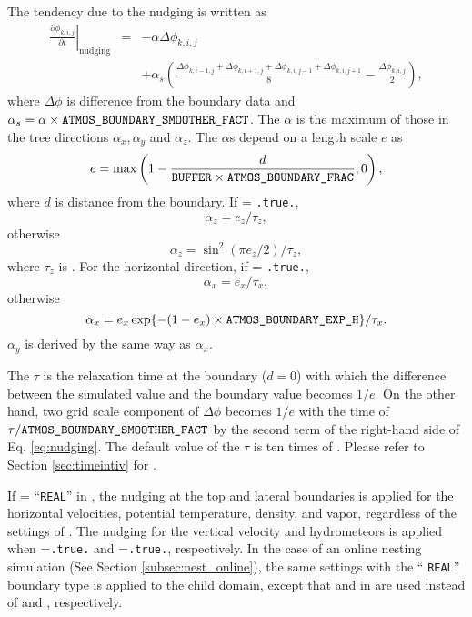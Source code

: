 The tendency due to the nudging is written as
\begin{eqnarray}
  \left.\frac{\partial \phi_{k,i,j}}{\partial t}\right|_\mathrm{nudging}
  & = & - \alpha \Delta\phi_{k,i,j} \\ \nonumber
  && + \alpha_s \left( \frac{\Delta\phi_{k,i-1,j} + \Delta\phi_{k,i+1,j} + \Delta\phi_{k,i,j-1} + \Delta\phi_{k,i,j+1}}{8} - \frac{\Delta\phi_{k,i,j}}{2} \right),
\label{eq:nudging}
\end{eqnarray}
where $\Delta\phi$ is difference from the boundary data and $\alpha_s = \alpha \times \nmitemeq{ATMOS_BOUNDARY_SMOOTHER_FACT}$.
The $\alpha$ is the maximum of those in the tree directions $\alpha_x, \alpha_y$ and $\alpha_z$.
The $\alpha$s depend on a length scale $e$ as
\begin{equation}
  e = \max\left( 1 - \frac{d}{\texttt{BUFFER} \times \nmitemeq{ATMOS_BOUNDARY_FRAC}}, 0 \right),
\end{equation}
where $d$ is distance from the boundary.
If  = \verb|.true.|,
\begin{equation}
  \alpha_z = e_z / \tau_z,
\end{equation}
otherwise
\begin{equation}
  \alpha_z =  \sin^2(\pi e_z/2) / \tau_z,
\end{equation}
where $\tau_z$ is .
For the horizontal direction, if  = \verb|.true.|,
\begin{equation}
  \alpha_x = e_x / \tau_x,
\end{equation}
otherwise
\begin{equation}
  \alpha_x = e_x \exp\{ - (1-e_x) \times \nmitemeq{ATMOS_BOUNDARY_EXP_H} \} / \tau_x.
\end{equation}
$\alpha_y$ is derived by the same way as $\alpha_x$.

The $\tau$ is the relaxation time at the boundary ($d=0$) with which the difference between the simulated value and the boundary value becomes $1/e$.
On the other hand, two grid scale component of $\Delta \phi$ becomes $1/e$ with the time of $\tau/\nmitemeq{ATMOS_BOUNDARY_SMOOTHER_FACT}$ by the second term of the right-hand side of Eq. \ref{eq:nudging}.
The default value of the $\tau$ is ten times of .
Please refer to Section \ref{sec:timeintiv} for .


If  = ``\verb|REAL|'' in ,
the nudging at the top and lateral boundaries is applied for the horizontal velocities, potential temperature, density, and vapor,
regardless of the settings of .
The nudging for the vertical velocity and hydrometeors is applied
when =\verb|.true.| and =\verb|.true.|, respectively.
In the case of an online nesting simulation (See Section \ref{subsec:nest_online}),
the same settings with the `` \verb|REAL|'' boundary type is applied to the child domain,
except that  and  in 
are used instead of  and , respectively.


